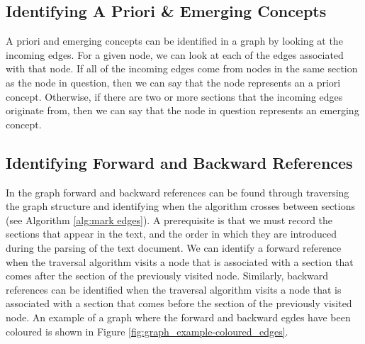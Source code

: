 \documentclass[12pt]{article}
\theoremstyle{grammarstyle}
\begin{document}
\subsection{Identifying A Priori \& Emerging Concepts}
A priori and emerging concepts can be identified in a graph by looking at the incoming edges. For a given node, we can look at each of the edges associated with that node. If all of the incoming edges come from nodes in the same section as the node in question, then we can say that the node represents an a priori concept. Otherwise, if there are two or more sections that the incoming edges originate from, then we can say that the node in question represents an emerging concept. 

\subsection{Identifying Forward and Backward References}
In the graph forward and backward references can be found through traversing the graph structure and identifying when the algorithm crosses between sections (see Algorithm \ref{alg:mark edges}). A prerequisite is that we must record the sections that appear in the text, and the order in which they are introduced during the parsing of the text document. We can identify a forward reference when the traversal algorithm visits a node that is associated with a section that comes after the section of the previously visited node. Similarly, backward references can be identified when the traversal algorithm visits a node that is associated with a section that comes before the section of the previously visited node. An example of a graph where the forward and backward egdes have been coloured is shown in Figure \ref{fig:graph_example-coloured_edges}.

\DontPrintSemicolon
\end{document}
